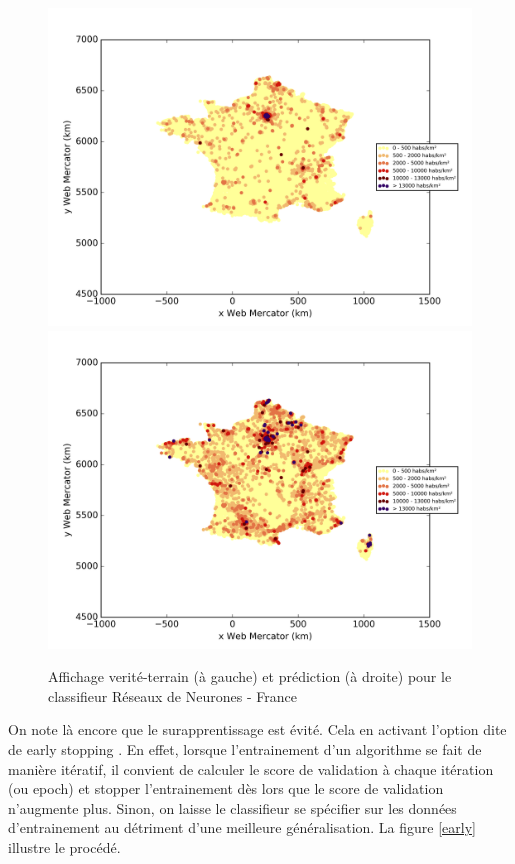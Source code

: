 \documentclass{book}
\begin{document}
\begin{figure}[H]
\centerline{
\includegraphics[scale=0.5]{../../data/France/test/Neural_Network_Classification-oversampling/Neural_Network_Classification-oversampling/density_ground_truth.png}
\includegraphics[scale=0.5]{../../data/France/test/Neural_Network_Classification-oversampling/Neural_Network_Classification-oversampling/density_classification.png}
}
\caption{Affichage verité-terrain (à gauche) et prédiction (à droite) pour le classifieur Réseaux de Neurones - France}
\label{nn_carte}
\end{figure}

On note là encore que le surapprentissage est évité. Cela en activant l'option dite de \og early stopping \fg{}. En effet, lorsque l'entrainement d'un algorithme se fait de manière itératif, il convient
de calculer le score de validation à chaque itération (ou epoch) et stopper l'entrainement dès lors que le score de validation n'augmente plus. Sinon, on laisse le classifieur se spécifier sur les données d'entrainement
au détriment d'une meilleure généralisation.
La figure \ref{early} illustre le procédé.
\end{document}
